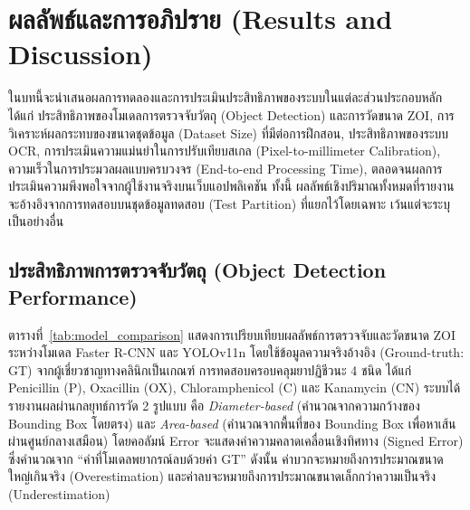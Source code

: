 ﻿%
\chapter{ผลลัพธ์และการอภิปราย (Results and Discussion)}

ในบทนี้จะนำเสนอผลการทดลองและการประเมินประสิทธิภาพของระบบในแต่ละส่วนประกอบหลัก ได้แก่ ประสิทธิภาพของโมเดลการตรวจจับวัตถุ (Object Detection) และการวัดขนาด ZOI, การวิเคราะห์ผลกระทบของขนาดชุดข้อมูล (Dataset Size) ที่มีต่อการฝึกสอน, ประสิทธิภาพของระบบ OCR, การประเมินความแม่นยำในการปรับเทียบสเกล (Pixel-to-millimeter Calibration), ความเร็วในการประมวลผลแบบครบวงจร (End-to-end Processing Time), ตลอดจนผลการประเมินความพึงพอใจจากผู้ใช้งานจริงบนเว็บแอปพลิเคชัน ทั้งนี้ ผลลัพธ์เชิงปริมาณทั้งหมดที่รายงานจะอ้างอิงจากการทดสอบบนชุดข้อมูลทดสอบ (Test Partition) ที่แยกไว้โดยเฉพาะ เว้นแต่จะระบุเป็นอย่างอื่น

\section{ประสิทธิภาพการตรวจจับวัตถุ (Object Detection Performance)}
\label{sec:detection_performance}

ตารางที่~\ref{tab:model_comparison} แสดงการเปรียบเทียบผลลัพธ์การตรวจจับและวัดขนาด ZOI ระหว่างโมเดล Faster R-CNN และ YOLOv11n โดยใช้ข้อมูลความจริงอ้างอิง (Ground-truth: GT) จากผู้เชี่ยวชาญทางคลินิกเป็นเกณฑ์ การทดสอบครอบคลุมยาปฏิชีวนะ 4 ชนิด ได้แก่ Penicillin (P), Oxacillin (OX), Chloramphenicol (C) และ Kanamycin (CN) ระบบได้รายงานผลผ่านกลยุทธ์การวัด 2 รูปแบบ คือ \emph{Diameter-based} (คำนวณจากความกว้างของ Bounding Box โดยตรง) และ \emph{Area-based} (คำนวณจากพื้นที่ของ Bounding Box เพื่อหาเส้นผ่านศูนย์กลางเสมือน) โดยคอลัมน์ Error จะแสดงค่าความคลาดเคลื่อนเชิงทิศทาง (Signed Error) ซึ่งคำนวณจาก ``ค่าที่โมเดลพยากรณ์ลบด้วยค่า GT'' ดังนั้น ค่าบวกจะหมายถึงการประมาณขนาดใหญ่เกินจริง (Overestimation) และค่าลบจะหมายถึงการประมาณขนาดเล็กกว่าความเป็นจริง (Underestimation)

